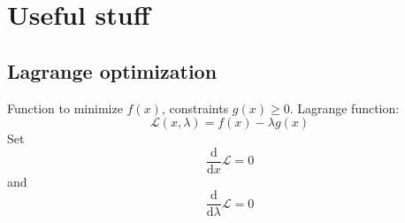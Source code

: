 \documentclass[a4paper]{scrartcl}
\begin{document}

\section{Useful stuff}

\subsection{Lagrange optimization}
Function to minimize $f(x)$, constraints $g(x)\ge 0$. Lagrange function:
\[\mathcal{L}(x,\lambda)=f(x)-\lambda g(x)\]
Set
\[\frac{\mathrm{d}}{\mathrm{d}x}\mathcal{L}=0\] and
\[\frac{\mathrm{d}}{\mathrm{d}\lambda}\mathcal{L}=0\]

\end{document}
